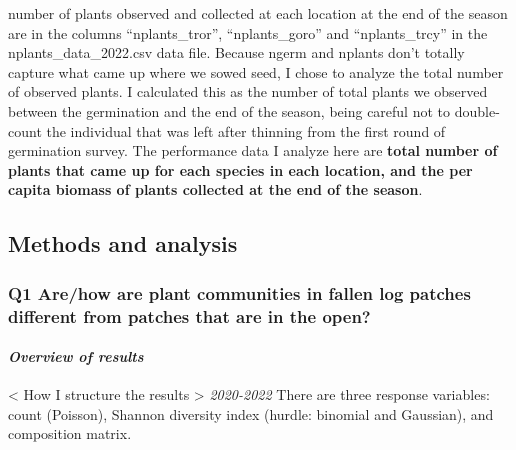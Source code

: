 \documentclass[
]{article}
\begin{document}
\begin{itemize}
  number of plants observed and collected at each location at the end of
  the season are in the columns ``nplants\_tror'', ``nplants\_goro'' and
  ``nplants\_trcy'' in the nplants\_data\_2022.csv data file. Because
  ngerm and nplants don't totally capture what came up where we sowed
  seed, I chose to analyze the total number of observed plants. I
  calculated this as the number of total plants we observed between the
  germination and the end of the season, being careful not to
  double-count the individual that was left after thinning from the
  first round of germination survey. The performance data I analyze here
  are \textbf{total number of plants that came up for each species in
  each location, and the per capita biomass of plants collected at the
  end of the season}.
\end{itemize}

\hypertarget{methods-and-analysis}{%
\subsection{Methods and analysis}\label{methods-and-analysis}}

\hypertarget{q1-arehow-are-plant-communities-in-fallen-log-patches-different-from-patches-that-are-in-the-open}{%
\subsubsection{\texorpdfstring{\textbf{Q1 Are/how are plant communities
in fallen log patches different from patches that are in the open?}
}{Q1 Are/how are plant communities in fallen log patches different from patches that are in the open?  }}\label{q1-arehow-are-plant-communities-in-fallen-log-patches-different-from-patches-that-are-in-the-open}}

\hypertarget{overview-of-results}{%
\paragraph{\texorpdfstring{\emph{Overview of results}
}{Overview of results  }}\label{overview-of-results}}

\textless{} How I structure the results \textgreater{} \emph{2020-2022}
There are three response variables: count (Poisson), Shannon diversity
index (hurdle: binomial and Gaussian), and composition matrix.
\end{document}
